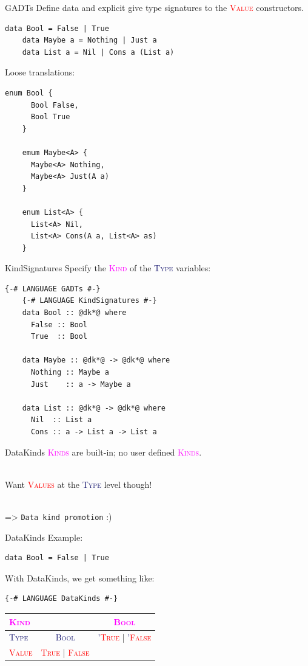 \documentclass[xcolor={usenames,dvipsnames}]{beamer}
\newcommand{\htycon}[1]{\textcolor{MidnightBlue}{\textsc{#1}}}
\newcommand{\hvalcon}[1]{\textcolor{Red}{\textsc{#1}}}
\newcommand{\hkind}[1]{\textcolor{Fuchsia}{\textsc{#1}}}
\begin{document}
\begin{frame}[fragile]{GADTs}
  Define data and explicit give type signatures to the \hvalcon{Value} constructors.
  \begin{lstlisting}[style=hask]
    data Bool = False | True
    data Maybe a = Nothing | Just a
    data List a = Nil | Cons a (List a)
  \end{lstlisting}

  Loose translations:
  \begin{lstlisting}[style=hask]
    enum Bool {
      Bool False,
      Bool True
    }

    emum Maybe<A> {
      Maybe<A> Nothing,
      Maybe<A> Just(A a)
    }

    enum List<A> {
      List<A> Nil,
      List<A> Cons(A a, List<A> as)
    }
  \end{lstlisting}
\end{frame}

\begin{frame}[fragile]{KindSignatures}
  Specify the \hkind{Kind} of the \htycon{Type} variables:
  \begin{lstlisting}[style=hask]
    {-# LANGUAGE GADTs #-}
    {-# LANGUAGE KindSignatures #-}
    data Bool :: @dk*@ where
      False :: Bool
      True  :: Bool

    data Maybe :: @dk*@ -> @dk*@ where
      Nothing :: Maybe a
      Just    :: a -> Maybe a

    data List :: @dk*@ -> @dk*@ where
      Nil  :: List a
      Cons :: a -> List a -> List a
  \end{lstlisting}
\end{frame}

\begin{frame}[fragile]{DataKinds}
  \hkind{Kinds} are built-in; no user defined \hkind{Kinds}.

  \ \\
  \pause
  Want \hvalcon{Values} at the \htycon{Type} level though!

  \ \\
  \pause
  => \texttt{Data kind promotion} :)
\end{frame}

\begin{frame}[fragile]{DataKinds}
  Example:
  \begin{lstlisting}[style=hask]
    data Bool = False | True
  \end{lstlisting}

  With DataKinds, we get something like:
  \begin{lstlisting}[style=hask]
    {-# LANGUAGE DataKinds #-}
  \end{lstlisting}
  \begin{tabular}{l || c | c}
    \hkind{Kind} & \ & \hkind{Bool} \\
    \hline \htycon{Type} & \htycon{Bool} & \htycon{'}\hvalcon{True} | \htycon{'}\hvalcon{False} \\
    \hline \hvalcon{Value} & \hvalcon{True} | \hvalcon{False} & \ \\
  \end{tabular}
\end{frame}
\end{document}
